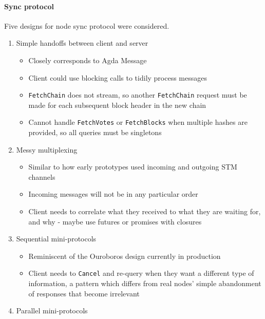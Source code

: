\documentclass[10pt]{article}
\providecommand{\tightlist}{%
  \setlength{\itemsep}{0pt}\setlength{\parskip}{0pt}}
\begin{document}
\paragraph{Sync protocol}\label{sync-protocol}

Five designs for node sync protocol were considered.

\begin{enumerate}
\def\labelenumi{\arabic{enumi}.}
\tightlist
\item
  Simple handoffs between client and server

  \begin{itemize}
  \tightlist
  \item
    Closely corresponds to Agda Message
  \item
    Client could use blocking calls to tidily process messages
  \item
    \texttt{FetchChain} does not stream, so another \texttt{FetchChain}
    request must be made for each subsequent block header in the new
    chain
  \item
    Cannot handle \texttt{FetchVotes} or \texttt{FetchBlocks} when
    multiple hashes are provided, so all queries must be singletons
  \end{itemize}
\item
  Messy multiplexing

  \begin{itemize}
  \tightlist
  \item
    Similar to how early prototypes used incoming and outgoing STM
    channels
  \item
    Incoming messages will not be in any particular order
  \item
    Client needs to correlate what they received to what they are
    waiting for, and why - maybe use futures or promises with closures
  \end{itemize}
\item
  Sequential mini-protocols

  \begin{itemize}
  \tightlist
  \item
    Reminiscent of the Ouroboros design currently in production
  \item
    Client needs to \texttt{Cancel} and re-query when they want a
    different type of information, a pattern which differs from real
    nodes' simple abandonment of responses that become irrelevant
  \end{itemize}
\item
  Parallel mini-protocols


\end{enumerate}
\end{document}
